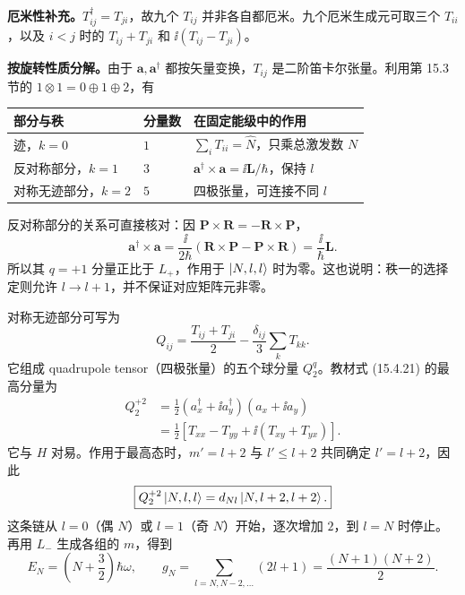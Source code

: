 \textbf{厄米性补充。}$T_{ij}^\dagger=T_{ji}$，故九个 $T_{ij}$ 并非各自都厄米。九个厄米生成元可取三个 $T_{ii}$，以及 $i<j$ 时的 $T_{ij}+T_{ji}$ 和 $\ii(T_{ij}-T_{ji})$。

\textbf{按旋转性质分解。}由于 $\mathbf a,\mathbf a^\dagger$ 都按矢量变换，$T_{ij}$ 是二阶笛卡尔张量。利用第 15.3 节的 $1\otimes1=0\oplus1\oplus2$，有
\begin{center}
\begin{tabularx}{\textwidth}{@{}llX@{}}
  \toprule
  部分与秩 & 分量数 & 在固定能级中的作用 \\
  \midrule
  迹，$k=0$ & $1$ & $\sum_iT_{ii}=\widehat N$，只乘总激发数 $N$ \\
  反对称部分，$k=1$ & $3$ & $\mathbf a^\dagger\times\mathbf a=\ii\mathbf L/\hbar$，保持 $l$ \\
  对称无迹部分，$k=2$ & $5$ & 四极张量，可连接不同 $l$ \\
  \bottomrule
\end{tabularx}
\end{center}
反对称部分的关系可直接核对：因 $\mathbf P\times\mathbf R=-\mathbf R\times\mathbf P$，
\begin{equation}
  \mathbf a^\dagger\times\mathbf a
    =\frac{\ii}{2\hbar}(\mathbf R\times\mathbf P-\mathbf P\times\mathbf R)
    =\frac{\ii}{\hbar}\mathbf L.
\end{equation}
所以其 $q=+1$ 分量正比于 $L_+$，作用于 $\left|N,l,l\right\rangle$ 时为零。这也说明：秩一的选择定则允许 $l\to l+1$，并不保证对应矩阵元非零。

对称无迹部分可写为
\begin{equation}
  Q_{ij}=\frac{T_{ij}+T_{ji}}2-\frac{\delta_{ij}}3\sum_kT_{kk}.
\end{equation}
它组成 quadrupole tensor（四极张量）的五个球分量 $Q_2^q$。教材式 (15.4.21) 的最高分量为
\begin{equation}
  \boxed{\begin{aligned}
    Q_2^{+2}
      &=\frac12(a_x^\dagger+\ii a_y^\dagger)(a_x+\ii a_y)\\
      &=\frac12\left[T_{xx}-T_{yy}+\ii(T_{xy}+T_{yx})\right].
  \end{aligned}}
\end{equation}
它与 $H$ 对易。作用于最高态时，$m'=l+2$ 与 $l'\le l+2$ 共同确定 $l'=l+2$，因此
\begin{equation}
  \boxed{Q_2^{+2}\left|N,l,l\right\rangle=d_{Nl}\left|N,l+2,l+2\right\rangle.}
\end{equation}
这条链从 $l=0$（偶 $N$）或 $l=1$（奇 $N$）开始，逐次增加 $2$，到 $l=N$ 时停止。再用 $L_-$ 生成各组的 $m$，得到
\begin{equation}
  E_N=\left(N+\frac32\right)\hbar\omega,\qquad
  \boxed{g_N=\sum_{l=N,N-2,\ldots}(2l+1)=\frac{(N+1)(N+2)}2.}
\end{equation}

